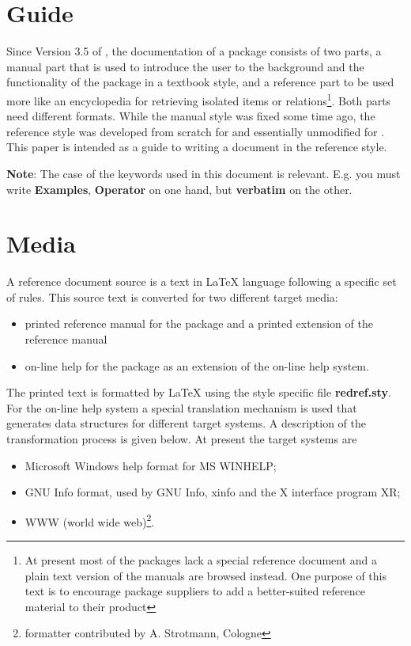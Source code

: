 \newpage
\section{Guide}

Since Version 3.5 of \REDUCE, the documentation of a package consists of two
parts, a manual part that is used to introduce the user to the background
and the functionality of the package in a textbook style, and a reference
part to be used more like an encyclopedia for retrieving isolated items or
relations\footnote{%
At present most of the packages lack a special reference document and a
plain text version of the manuals are browsed instead. One purpose of this
text is to encourage package suppliers to add a better-suited reference
material to their product}. Both parts need different formats. While the
\REDUCE manual style was fixed some time ago, the \REDUCE reference style
was developed from scratch for  and essentially unmodified for
.  This paper is intended as a guide to writing a document in
the reference style.

{\bf Note}: The case of the keywords used in this document is relevant. E.g.
you must write {\bf Examples}, {\bf Operator} on one hand, but {\bf verbatim}
on the other.

\section{Media}

A reference document source is a text in \LaTeX{} language following a
specific set of rules. This source text is converted for two different
target media:

\begin{itemize}
\item  printed reference manual for the package and a printed extension of
the \REDUCE reference manual

\item  on-line help for the package as an extension of the \REDUCE on-line
help system.
\end{itemize}

The printed text is formatted by \LaTeX{} using the style specific file {\bf %
redref.sty}. For the on-line help system a special translation mechanism is
used that generates data structures for different target systems. A
description of the transformation process is given below. At present the
target systems are

\begin{itemize}
\item  Microsoft Windows help format for MS WINHELP;

\item  GNU Info format, used by GNU Info, xinfo and the \REDUCE X interface
program XR;

\item  WWW (world wide web)\footnote{%
formatter contributed by A. Strotmann, Cologne}.
\end{itemize}

